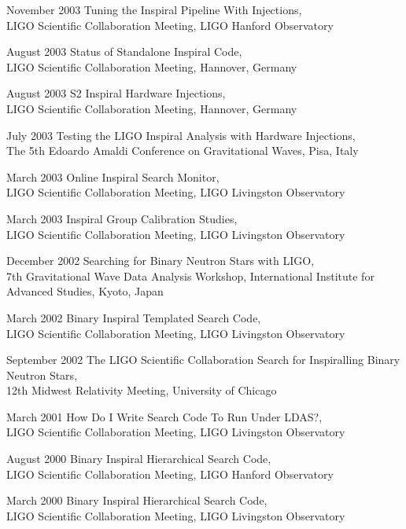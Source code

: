 \documentclass{cv}
\begin{document}
\begin{entry}
\item[November 2003] {Tuning the Inspiral Pipeline With Injections},\\
{\small LIGO Scientific Collaboration Meeting, LIGO Hanford Observatory}

\item[August 2003] {Status of Standalone Inspiral Code},\\
{\small LIGO Scientific Collaboration Meeting, Hannover, Germany}

\item[August 2003] {S2 Inspiral Hardware Injections},\\
{\small LIGO Scientific Collaboration Meeting, Hannover, Germany}

\item[July 2003] {Testing the LIGO Inspiral Analysis with Hardware Injections},\\
{\small The 5th Edoardo Amaldi Conference on Gravitational Waves, Pisa, Italy}

\item[March 2003] {Online Inspiral Search Monitor},\\
{\small LIGO Scientific Collaboration Meeting, LIGO Livingston Observatory}

\item[March 2003] {Inspiral Group Calibration Studies},\\
{\small LIGO Scientific Collaboration Meeting, LIGO Livingston Observatory}

\item[December 2002] {Searching for Binary Neutron Stars with LIGO},\\
{\small 7th Gravitational Wave Data Analysis Workshop, International Institute for Advanced Studies, Kyoto, Japan}

\item[March 2002] {Binary Inspiral Templated Search Code},\\
{\small LIGO Scientific Collaboration Meeting, LIGO Livingston Observatory}

\item[September 2002]{The LIGO Scientiﬁc Collaboration Search for Inspiralling Binary Neutron Stars},\\
{\small 12th Midwest Relativity Meeting, University of Chicago}

\item[March 2001] {How Do I Write Search Code To Run Under LDAS?},\\
{\small LIGO Scientific Collaboration Meeting, LIGO Livingston Observatory}

\item[August 2000] {Binary Inspiral Hierarchical Search Code},\\
{\small LIGO Scientific Collaboration Meeting, LIGO Hanford Observatory}

\item[March 2000] {Binary Inspiral Hierarchical Search Code},\\
{\small LIGO Scientific Collaboration Meeting, LIGO Livingston Observatory}

\end{entry}
\fi
\end{document}
